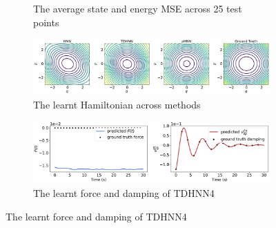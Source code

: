 \documentclass{article}
\begin{document}
\begin{figure}[!htb]
\begin{subfigure}[b]{0.48\textwidth}
\caption{The average state and energy MSE across 25 test points}
\end{subfigure}
\begin{subfigure}[b]{0.48\textwidth}
\includegraphics[width=\textwidth]{figures/figures/damped/1/damped_hamiltonian_0.pdf}
\caption{The learnt Hamiltonian across methods}
\end{subfigure}
\begin{subfigure}[b]{0.48\textwidth}
\includegraphics[width=\textwidth]{figures/figures/damped/1/damped_dpdt_new_0.pdf}
\caption{The learnt force and damping of TDHNN4}
\end{subfigure}
\label{mspring_full}
\end{figure}
\end{document}
